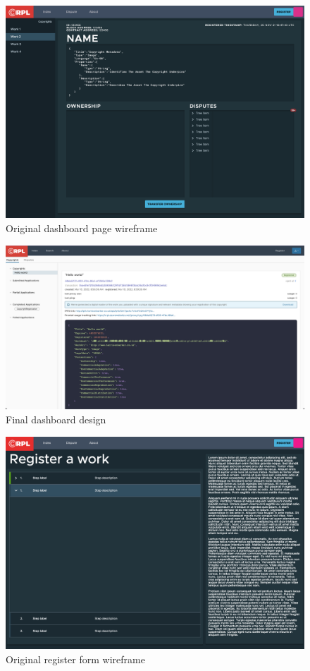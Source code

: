 \begin{figure}[H]
\caption{Original dashboard page wireframe}
\centering
\includegraphics[width=\textwidth,height=0.5\textheight,keepaspectratio]{images/wireframe/Dashboard}
\end{figure}

\begin{figure}[H]
\caption{Final dashboard design}
\centering
\includegraphics[width=\textwidth,height=0.5\textheight,keepaspectratio]{images/wireframe/dashboard-real}
\end{figure}

\begin{figure}[H]
\caption{Original register form wireframe}
\centering
\includegraphics[width=\textwidth,height=0.5\textheight,keepaspectratio]{images/wireframe/Register}
\end{figure}

